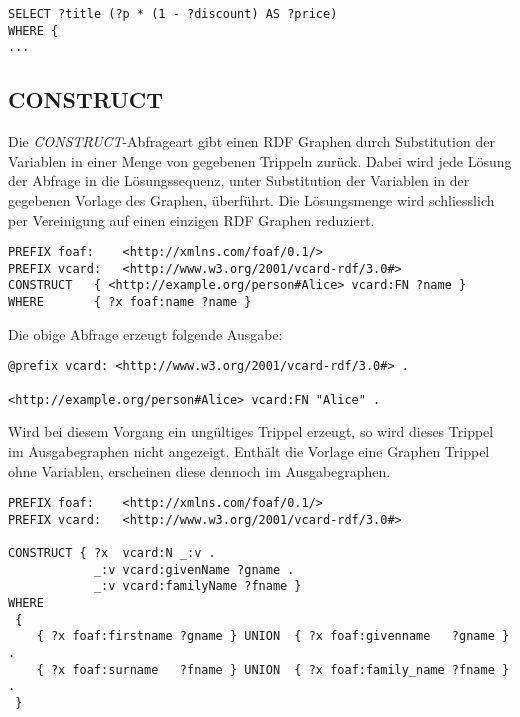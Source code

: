 \begin{lstlisting}
SELECT ?title (?p * (1 - ?discount) AS ?price)
WHERE {
...
\end{lstlisting}


\subsection{CONSTRUCT}
\label{subsec:sparql_abfragearten_construct}
Die \textit{CONSTRUCT}-Abfrageart gibt einen RDF Graphen durch Substitution der Variablen in einer Menge von gegebenen Trippeln zurück. Dabei wird jede Lösung der Abfrage in die Lösungssequenz, unter Substitution der Variablen in der gegebenen Vorlage des Graphen, überführt. Die Lösungsmenge wird schliesslich per Vereinigung auf einen einzigen RDF Graphen reduziert.

\begin{lstlisting}
PREFIX foaf:    <http://xmlns.com/foaf/0.1/>
PREFIX vcard:   <http://www.w3.org/2001/vcard-rdf/3.0#>
CONSTRUCT   { <http://example.org/person#Alice> vcard:FN ?name }
WHERE       { ?x foaf:name ?name }
\end{lstlisting}

Die obige Abfrage erzeugt folgende Ausgabe:
\begin{lstlisting}
@prefix vcard: <http://www.w3.org/2001/vcard-rdf/3.0#> .

<http://example.org/person#Alice> vcard:FN "Alice" .
\end{lstlisting}

Wird bei diesem Vorgang ein ungültiges Trippel erzeugt, so wird dieses Trippel im Ausgabegraphen nicht angezeigt. Enthält die Vorlage eine Graphen Trippel ohne Variablen, erscheinen diese dennoch im Ausgabegraphen.

\begin{lstlisting}
PREFIX foaf:    <http://xmlns.com/foaf/0.1/>
PREFIX vcard:   <http://www.w3.org/2001/vcard-rdf/3.0#>

CONSTRUCT { ?x  vcard:N _:v .
            _:v vcard:givenName ?gname .
            _:v vcard:familyName ?fname }
WHERE
 {
    { ?x foaf:firstname ?gname } UNION  { ?x foaf:givenname   ?gname } .
    { ?x foaf:surname   ?fname } UNION  { ?x foaf:family_name ?fname } .
 }
\end{lstlisting}

